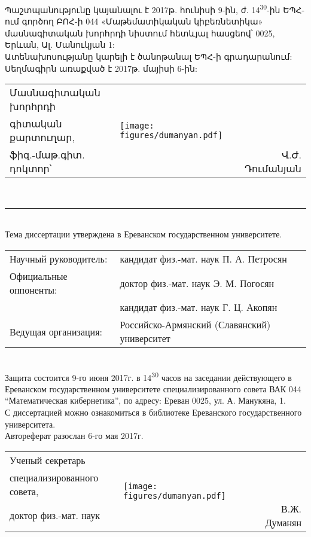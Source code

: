 Պաշտպանությունը կայանալու է 2017թ. հունիսի 9-ին, ժ. 14\textsuperscript{30}-ին ԵՊՀ-ում գործող ԲՈՀ-ի 044 «Մաթեմատիկական կիբեռնետիկա» մասնագիտական խորհրդի նիստում հետևյալ հասցեով՝ 0025, Երևան, Ալ. Մանուկյան 1:\\[0.5cm]  
Ատենախոսությանը կարելի է ծանոթանալ ԵՊՀ-ի գրադարանում: \\[0.5cm]
Սեղմագիրն առաքված է 2017թ. մայիսի 6-ին:\\[0.5cm]
\begin{tabularx}{\textwidth}{Xlr}
Մասնագիտական խորհրդի  & \multirow{3}{*}{\texttt{[image: figures/dumanyan.pdf]}\hspace{1cm}} &                \\
գիտական քարտուղար,    &                                                                                    &                \\
ֆիզ.-մաթ.գիտ. դոկտոր՝ &                                                                                    & Վ.Ժ. Դումանյան
\end{tabularx}\\[0.5cm]

\rule{\textwidth}{1pt}\\[0.4cm]

Тема диссертации утверждена в Ереванском государственном университете.\\[0.3cm]

\begin{tabularx}{\textwidth}{Xl}
Научный руководитель:     & кандидат физ.-мат. наук П. А. Петросян \\
Официальные оппоненты:  & доктор физ.-мат. наук Э. М. Погосян \\
 & кандидат физ.-мат. наук Г. Ц. Акопян \\
Ведущая организация:  & Российско-Армянский (Славянский) университет
\end{tabularx}\\[0.5cm]
                          
Защита состоится 9-го июня 2017г. в 14\textsuperscript{30} часов на заседании действующего в Ереванском государственном университете специализированного совета ВАК 044
“Математическая кибернетика”, по адресу: Ереван 0025, ул. А. Манукяна, 1.\\[0.5cm]
С диссертацией можно ознакомиться в библиотеке Ереванского государственного университета.\\[0.5cm]
Автореферат разослан 6-го мая 2017г. \\[0.5cm]

\begin{tabularx}{\textwidth}{Xlr}
Ученый секретарь  & \multirow{3}{*}{\texttt{[image: figures/dumanyan.pdf]}\hspace{1cm}} &                \\
специализированного  совета,    &                                                                                    &                \\
доктор физ.-мат. наук &                                                                                    & В.Ж. Думанян
\end{tabularx}


\pagebreak